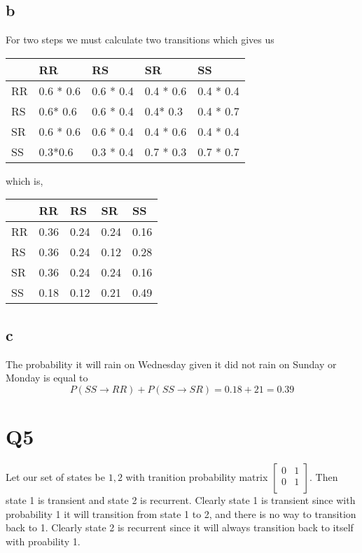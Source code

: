 \documentclass{article}
\begin{document}
\subsection*{b}
For two steps we must calculate two transitions which gives us
\begin{tabular}{| l | l | l | l |l|}
	\hline
     & RR & RS & SR & SS \\ \hline
    RR & 0.6 * 0.6 & 0.6 * 0.4 & 0.4 * 0.6 & 0.4 * 0.4 \\ \hline
    RS & 0.6* 0.6 & 0.6 * 0.4 & 0.4* 0.3 & 0.4 * 0.7 \\ \hline
    SR & 0.6 * 0.6 & 0.6 * 0.4 & 0.4 * 0.6 & 0.4 * 0.4 \\ \hline
    SS & 0.3*0.6 & 0.3 * 0.4 & 0.7 * 0.3 & 0.7 * 0.7 \\ \hline 
\end{tabular}

which is,
\begin{tabular}{| l | l | l | l |l|}
	\hline
     & RR & RS & SR & SS \\ \hline
    RR & 0.36 & 0.24 & 0.24 & 0.16 \\ \hline
    RS & 0.36 & 0.24 & 0.12 & 0.28 \\ \hline
    SR & 0.36 & 0.24 & 0.24 & 0.16 \\ \hline
    SS & 0.18 & 0.12 & 0.21 & 0.49 \\ \hline 
\end{tabular}

\subsection*{c}
The probability it will rain on Wednesday given it did not rain on Sunday or Monday is equal to 
\[
P(SS \rightarrow RR ) + P(SS \rightarrow SR) = 0.18 + 21 = 0.39
\]


\section*{Q5}
Let our set of states be ${1,2}$ with tranition probability matrix
$
\begin{bmatrix}
0 & 1 \\
0 & 1 \\
\end{bmatrix}
$. Then state 1 is transient and state 2 is recurrent. Clearly state 1 is transient since with probability 1 it will transition from state 1 to 2, and there is no way to transition back to 1. Clearly state 2 is recurrent since it will always transition back to itself with proability 1. 
\end{document}
